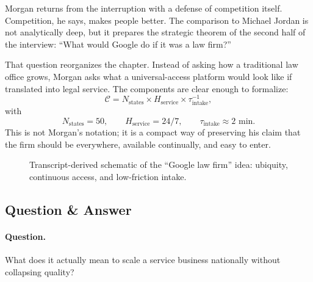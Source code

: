 Morgan returns from the interruption with a defense of competition itself. Competition, he says, makes people better. The comparison to Michael Jordan is not analytically deep, but it prepares the strategic theorem of the second half of the interview: ``What would Google do if it was a law firm?''

That question reorganizes the chapter. Instead of asking how a traditional law office grows, Morgan asks what a universal-access platform would look like if translated into legal service. The components are clear enough to formalize:
\begin{equation}
\mathcal{C} = N_{\mathrm{states}} \times H_{\mathrm{service}} \times \tau_{\mathrm{intake}}^{-1},
\end{equation}
with
\begin{equation}
N_{\mathrm{states}} = 50, \qquad H_{\mathrm{service}} = 24/7, \qquad \tau_{\mathrm{intake}} \approx 2 \text{ min}.
\end{equation}
This is not Morgan's notation; it is a compact way of preserving his claim that the firm should be everywhere, available continually, and easy to enter.

\begin{figure}
\centering
{}
\caption{Transcript-derived schematic of the ``Google law firm'' idea: ubiquity, continuous access, and low-friction intake.}
\label{fig:google-law}
\end{figure}

\subsection{Question \& Answer}

\paragraph{Question.} What does it actually mean to scale a service business nationally without collapsing quality?

